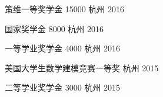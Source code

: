 


\begin{cvhonors}

\cvhonor
{策维一等奖学金} %
{15000} %
{杭州} %
{2016} %



\cvhonor
{国家奖学金} %
{8000} %
{杭州} %
{2016} %


\cvhonor
{一等学业奖学金} %
{4000} %
{杭州} %
{2016} %


\cvhonor
{美国大学生数学建模竞赛一等奖} %
{} %
{杭州} %
{2015} %


\cvhonor
{二等学业奖学金} %
{3000} %
{杭州} %
{2015} %


\end{cvhonors}
